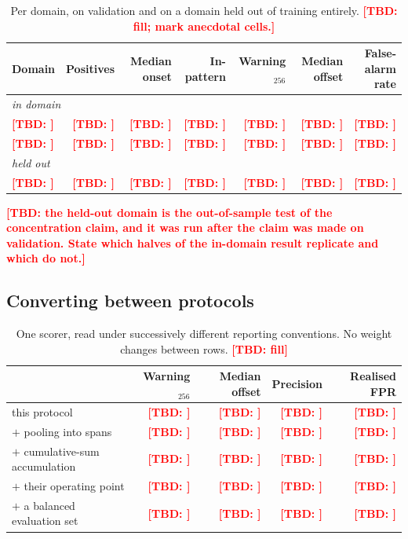 \documentclass{article}
\newcommand{\TBD}[1]{\textcolor{red}{\textbf{[TBD: #1]}}}
\begin{document}
\begin{table}[t]
  \caption{Per domain, on validation and on a domain held out of training
  entirely. \TBD{fill; mark anecdotal cells.}}
  \label{tab:domain}
  \centering
  \small
  \begin{tabular}{lrrrrrr}
    \toprule
    Domain & Positives & Median onset & In-pattern & Warning$_{256}$ & Median offset & False-alarm rate \\
    \midrule
    \multicolumn{7}{l}{\emph{in domain}} \\
    \TBD{} & \TBD{} & \TBD{} & \TBD{} & \TBD{} & \TBD{} & \TBD{} \\
    \TBD{} & \TBD{} & \TBD{} & \TBD{} & \TBD{} & \TBD{} & \TBD{} \\
    \midrule
    \multicolumn{7}{l}{\emph{held out}} \\
    \TBD{} & \TBD{} & \TBD{} & \TBD{} & \TBD{} & \TBD{} & \TBD{} \\
    \bottomrule
  \end{tabular}
\end{table}

\TBD{the held-out domain is the out-of-sample test of the concentration claim,
and it was run after the claim was made on validation. State which halves of the
in-domain result replicate and which do not.}

\subsection{Converting between protocols}
\label{sec:exp-bridge}

\begin{table}[t]
  \caption{One scorer, read under successively different reporting conventions.
  No weight changes between rows. \TBD{fill}}
  \label{tab:bridge}
  \centering
  \small
  \begin{tabular}{lrrrr}
    \toprule
    & Warning$_{256}$ & Median offset & Precision & Realised FPR \\
    \midrule
    this protocol                       & \TBD{} & \TBD{} & \TBD{} & \TBD{} \\
    $+$ pooling into spans              & \TBD{} & \TBD{} & \TBD{} & \TBD{} \\
    $+$ cumulative-sum accumulation     & \TBD{} & \TBD{} & \TBD{} & \TBD{} \\
    $+$ their operating point           & \TBD{} & \TBD{} & \TBD{} & \TBD{} \\
    $+$ a balanced evaluation set       & \TBD{} & \TBD{} & \TBD{} & \TBD{} \\
    \bottomrule
  \end{tabular}
\end{table}
\end{document}
